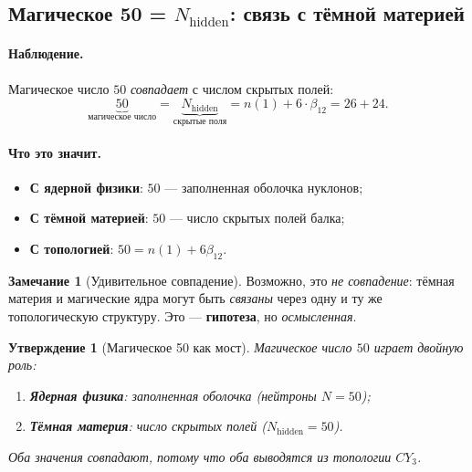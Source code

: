 \documentclass[11pt,a4paper]{article}
\newcommand{\CY}{CY_3}
\newcommand{\Nhidden}{N_{\text{hidden}}}
\newtheorem{proposition}[theorem]{Утверждение}
\theoremstyle{definition}
\newtheorem{remark}[theorem]{Замечание}
\begin{document}
\subsection{Магическое 50 = $\Nhidden$: связь с тёмной материей}
\label{subsec:magic-50-dm}

\paragraph{Наблюдение.}
Магическое число $50$ \emph{совпадает} с числом скрытых полей:
\begin{equation}
    \boxed{
    \underbrace{50}_{\text{магическое число}} 
    = \underbrace{\Nhidden}_{\text{скрытые поля}}
    = n(1) + 6 \cdot \beta_{12} = 26 + 24.
    }
    \label{eq:magic-50-dm}
\end{equation}

\paragraph{Что это значит.}
\begin{itemize}
    \item \textbf{С ядерной физики}: $50$ — заполненная оболочка 
          нуклонов;
    \item \textbf{С тёмной материей}: $50$ — число скрытых полей 
          балка;
    \item \textbf{С топологией}: $50 = n(1) + 6\beta_{12}$.
\end{itemize}

\begin{remark}[Удивительное совпадение]
\label{rem:magic-50-amazing}
Возможно, это \emph{не совпадение}: тёмная материя и 
магические ядра могут быть \emph{связаны} через одну и ту же 
топологическую структуру. Это — \textbf{гипотеза}, но 
\emph{осмысленная}.
\end{remark}

\begin{proposition}[Магическое 50 как мост]
\label{prop:magic-50-bridge}
Магическое число $50$ играет \emph{двойную} роль:
\begin{enumerate}
    \item \textbf{Ядерная физика}: заполненная оболочка 
          (нейтроны $N = 50$);
    \item \textbf{Тёмная материя}: число скрытых полей 
          ($\Nhidden = 50$).
\end{enumerate}
Оба значения совпадают, потому что оба выводятся из 
топологии $\CY$.
\end{proposition}
\end{document}
